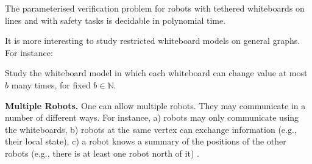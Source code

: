 \begin{theorem}
The parameterised verification problem for robots with tethered whiteboards on
lines and with safety tasks is decidable in polynomial time. 
\end{theorem}

It is more interesting to study  restricted whiteboard models on general graphs.
For instance:
\begin{problem}
Study the whiteboard model in which each whiteboard can change value at most $b$
many times, for fixed $b \in \mathbb{N}$. 
\end{problem}

{\bf Multiple Robots.}
 One can allow multiple robots. They may communicate in a number of different
ways. For instance, a) robots may only communicate using the whiteboards, b)
robots at the same vertex can exchange information (e.g., their local state), c)
a robot knows a summary of the positions of the other robots (e.g., there is at
least one robot north of it) \cite{AA}.






